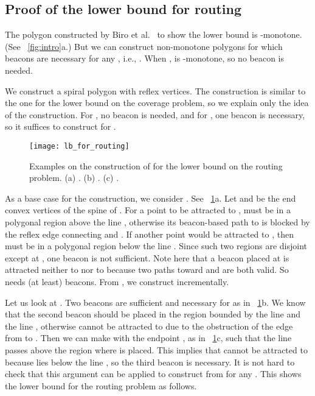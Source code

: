 \documentclass[11pt]{article}
\theoremstyle{definition}
\begin{document}
\subsection{Proof of the lower bound for routing}
The polygon constructed by Biro et al.~\cite{bgikm-cccg-13} to show the lower bound  is -monotone. (See \figurename~\ref{fig:intro}a.) But we can construct non-monotone polygons for which  beacons are necessary for any , i.e., . When ,  is -monotone, so no beacon is needed.

We construct a spiral polygon  with  reflex vertices. The construction is similar to the one for the lower bound on the coverage problem, so we explain only the idea of the construction. For , no beacon is needed, and for , one beacon is necessary, so it suffices to construct  for . 

\begin{figure}[tb]
\centering
\texttt{[image: lb\_for\_routing]}
\caption{Examples on the construction of  for the lower bound on the routing problem. (a) . (b) . (c) .}
\label{fig:lb_for_routing}
\end{figure}

As a base case for the construction, we consider . See \figurename~\ref{fig:lb_for_routing}a. Let  and  be the end convex vertices of the spine of . For a point  to be attracted to ,  must be in a polygonal region above the line , otherwise its beacon-based path to  is blocked by the reflex edge connecting  and . If another point  would be attracted to , then  must be in a polygonal region below the line . Since such two regions are disjoint except at , one beacon is not sufficient. Note here that a beacon placed at  is attracted neither to  nor to  because two paths toward  and  are both valid. So  needs (at least)  beacons. From , we construct  incrementally. 

Let us look at . Two beacons are sufficient and necessary for  as in \figurename~\ref{fig:lb_for_routing}b. We know that the second beacon  should be placed in the region bounded by the line  and the line , otherwise  cannot be attracted to  due to the obstruction of the edge from  to . Then we can make  with the endpoint , as in \figurename~\ref{fig:lb_for_routing}c, such that the line  passes above the region where  is placed.  This implies that  cannot be attracted to  because  lies below the line , so the third beacon is necessary. It is not hard to check that this argument can be applied to construct  from  for any . This shows the lower bound for the routing problem as follows.
\end{document}

